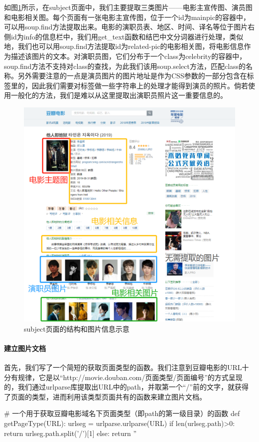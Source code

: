 \documentclass{article}
\begin{document}
如图\ref{fig:pagestructure}所示，在subject页面中，我们主要提取三类图片——电影主宣传图、演员图和电影相关图。每个页面有一张电影主宣传图，位于一个id为mainpic的容器中，可以用soup.find方法提取出来。电影的演职员表、地区、时间、译名等位于图片右侧id为info的信息栏中，我们用get\_text函数和结巴中文分词器进行处理，类似地，我们也可以用soup.find方法提取id为related-pic的电影相关图，将电影信息作为描述该图片的文本。对演职员图，它们分布于一个class为celebrity的容器中，soup.find方法不支持对class的查找，为此我们该用soup.select方法，匹配class的名称。另外需要注意的一点是演员图片的图片地址是作为CSS参数的一部分包含在标签里的，因此我们需要对标签做一些字符串上的处理才能得到演员的照片。倘若使用一般化的方法，我们是难以从这里提取出演职员照片这一重要信息的。

\begin{figure}[htbp]
\centering
\includegraphics[width=14.5cm]{img/pagestructure.png}
\caption{subject页面的结构和图片信息示意}
\label{fig:pagestructure}
\end{figure}

\paragraph{建立图片文档}

首先，我们写了一个简短的获取页面类型的函数。我们注意到豆瓣电影的URL十分有规律，它是以“http://movie.douban.com/页面类型/页面编号”的方式呈现的，我们通过urlparse库提取出URL中的path，并取第一个“/”前的文字，就获得了页面的类型，进而利用该类型页面共有的函数来建立图片文档。
\begin{python}
# 一个用于获取豆瓣电影域名下页面类型（即path的第一级目录）的函数
def getPageType(URL):
    urlseg = urlparse.urlparse(URL)
    if len(urlseg.path)>0:
        return urlseg.path.split('/')[1]
    else:
        return ''
\end{python}
\end{document}
